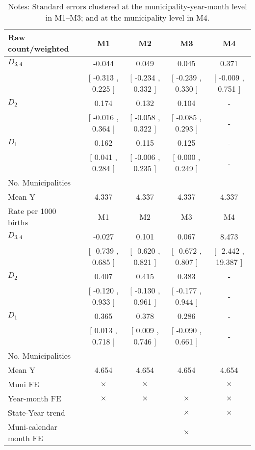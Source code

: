 \begin{table}[!ht]
\centering
\caption{Effects of Drought on vlbw}\label{tab:twfe_vlbw}
\fontsize{10pt}{12pt}\selectfont
\begin{tabular}{lcccc}
\toprule
  Raw count/weighted &\multicolumn{1}{c}{M1}&\multicolumn{1}{c}{M2}&\multicolumn{1}{c}{M3}&\multicolumn{1}{c}{M4} \\
\midrule
 $ D_{3,4} $ &    -0.044 &     0.049 &     0.045 &     0.371 \\ 
 & [    -0.313 ,     0.225 ] & [    -0.234 ,     0.332 ] & [    -0.239 ,     0.330 ] & [    -0.009 ,     0.751 ] \\ 
\addlinespace
 $ D_2 $ &     0.174 &     0.132 &     0.104 & - \\ 
 & [    -0.016 ,     0.364 ] & [    -0.058 ,     0.322 ] & [    -0.085 ,     0.293 ] & - \\ 
\addlinespace
 $ D_1 $ &     0.162 &     0.115 &     0.125 & - \\ 
 & [     0.041 ,     0.284 ] & [    -0.006 ,     0.235 ] & [     0.000 ,     0.249 ] & - \\ 
\addlinespace
\midrule
  No. Municipalities &  &  &  &   \\
  Mean Y &     4.337 &     4.337 &     4.337 &     4.337  \\
\addlinespace
\midrule
  Rate per 1000 births &\multicolumn{1}{c}{M1}&\multicolumn{1}{c}{M2}&\multicolumn{1}{c}{M3}&\multicolumn{1}{c}{M4} \\
\midrule
 $ D_{3,4} $ &    -0.027 &     0.101 &     0.067 &     8.473 \\ 
 & [    -0.739 ,     0.685 ] & [    -0.620 ,     0.821 ] & [    -0.672 ,     0.807 ] & [    -2.442 ,    19.387 ] \\ 
\addlinespace
 $ D_2 $ &     0.407 &     0.415 &     0.383 & - \\ 
 & [    -0.120 ,     0.933 ] & [    -0.130 ,     0.961 ] & [    -0.177 ,     0.944 ] & - \\ 
\addlinespace
 $ D_1 $ &     0.365 &     0.378 &     0.286 & - \\ 
 & [     0.013 ,     0.718 ] & [     0.009 ,     0.746 ] & [    -0.090 ,     0.661 ] & - \\ 
\midrule
  No. Municipalities &  &  &  &   \\
  Mean Y &     4.654 &     4.654 &     4.654 &     4.654  \\
  Muni FE & $ \times $ & $ \times $ &  & $ \times $  \\
  Year-month FE & $ \times $ & $ \times $ & $ \times $ & $ \times $ \\
  State-Year trend &  &  & $ \times $ & $ \times $ \\
  Muni-calendar month FE &  &  & $ \times $ & \\
\bottomrule
\end{tabular}
\caption*{\footnotesize{Notes: Standard errors clustered at the municipality-year-month level in M1--M3; and at the municipality level in M4.}}
\end{table}
